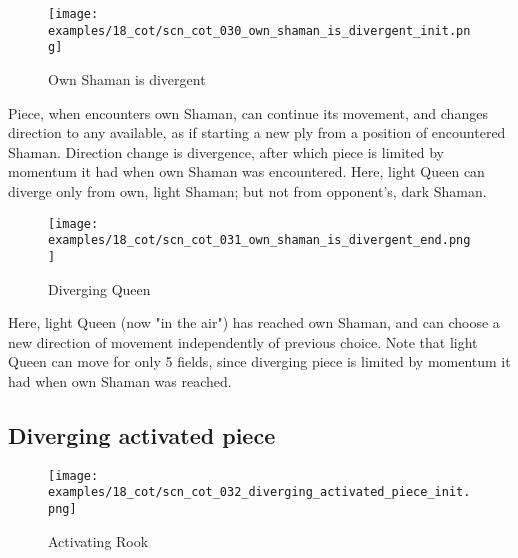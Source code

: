 \vspace*{-1.4\baselineskip}
\noindent
\begin{figure}[!h]
\texttt{[image: examples/18\_cot/scn\_cot\_030\_own\_shaman\_is\_divergent\_init.png]}
\vspace*{-1.3\baselineskip}
\caption{Own Shaman is divergent}
\label{fig:scn_cot_030_own_shaman_is_divergent_init}
\end{figure}

\vspace*{-0.5\baselineskip}
Piece, when encounters own Shaman, can continue its movement, and changes direction
to any available, as if starting a new ply from a position of encountered Shaman.
Direction change is divergence, after which piece is limited by momentum it had when
own Shaman was encountered.\newline
\indent
Here, light Queen can diverge only from own, light Shaman; but not from opponent's,
dark Shaman.

\clearpage %

\vspace*{-2.1\baselineskip}
\noindent
\begin{figure}[!h]
\texttt{[image: examples/18\_cot/scn\_cot\_031\_own\_shaman\_is\_divergent\_end.png]}
\vspace*{-1.3\baselineskip}
\caption{Diverging Queen}
\label{fig:scn_cot_031_own_shaman_is_divergent_end}
\end{figure}

\vspace*{-0.4\baselineskip}
Here, light Queen (now "in the air") has reached own Shaman, and can choose a new
direction of movement independently of previous choice. Note that light Queen can
move for only 5 fields, since diverging piece is limited by momentum it had when
own Shaman was reached.

\clearpage %

\subsection*{Diverging activated piece}
\label{sec:Conquest of Tlalocan/Divergence/Diverging activated piece}

\vspace*{-1.4\baselineskip}
\noindent
\begin{figure}[!h]
\texttt{[image: examples/18\_cot/scn\_cot\_032\_diverging\_activated\_piece\_init.png]}
\vspace*{-1.3\baselineskip}
\caption{Activating Rook}
\label{fig:scn_cot_032_diverging_activated_piece_init}
\end{figure}

